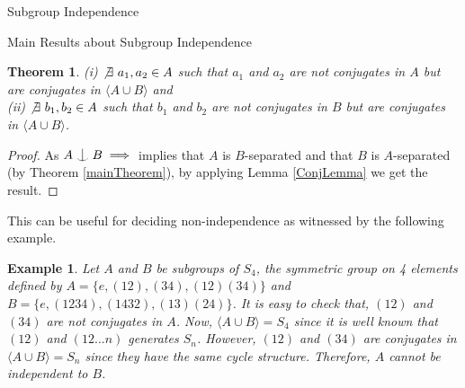\documentclass{article}
\newtheorem{theorem}{Theorem}[section]
\newtheorem{example}{Example}[section]
\def\indep{\mathrel{\raise0.2ex\hbox{\ooalign{\hidewidth$\vert$\hidewidth\cr\raise-0.9ex\hbox{$\smile$}}}}}
\begin{document}
\begin{section}{Subgroup Independence}
\begin{subsection}{Main Results about Subgroup Independence}
\begin{theorem}
				\noindent (i) 
				$ \not\exists \ a_1, a_2 \in A$ such that $a_1$ and $a_2$ are not conjugates in $A$ but are conjugates in $\langle  A \cup B\rangle $ and \\
				
				\noindent (ii)	
				$ \not\exists \ b_1, b_2 \in A$ such that $b_1$ and $b_2$ are not conjugates in $B$ but are conjugates in $\langle  A \cup B\rangle $.
				
			\end{theorem}
			
			\begin{proof}
				As $A \indep B \implies$ implies that $A$ is $B$-separated and that $B$ is $A$-separated (by Theorem \ref{mainTheorem}), by applying Lemma \ref{ConjLemma} we get the result.
			\end{proof}
			
			
			
			
			
			\noindent This can be  useful for deciding non-independence as witnessed by the following example.
			
			
			\begin{example}
				\normalfont
				Let $A$ and $B$ be subgroups of $S_4$, the symmetric group on 4 elements defined by $A = \{e, (12), (34), (12)(34)\}$ and $B = \{e, (1234), (1432), (13)(24)\}$. It is easy to check that, $(12)$ and $(34)$ are not conjugates in $A$. Now, $\langle  A \cup B\rangle  = S_4$ since it is well known that $(12)$ and $(12\dots n)$ generates $S_n$. However, $(12)$ and $(34)$ \textit{are} conjugates in $\langle  A \cup B\rangle = S_n$ since they have the same cycle structure. Therefore, $A$ cannot be independent to $B$.
			\end{example}	
			
			
		\end{subsection}
		
		
		
	\end{section}
	
\end{document}
